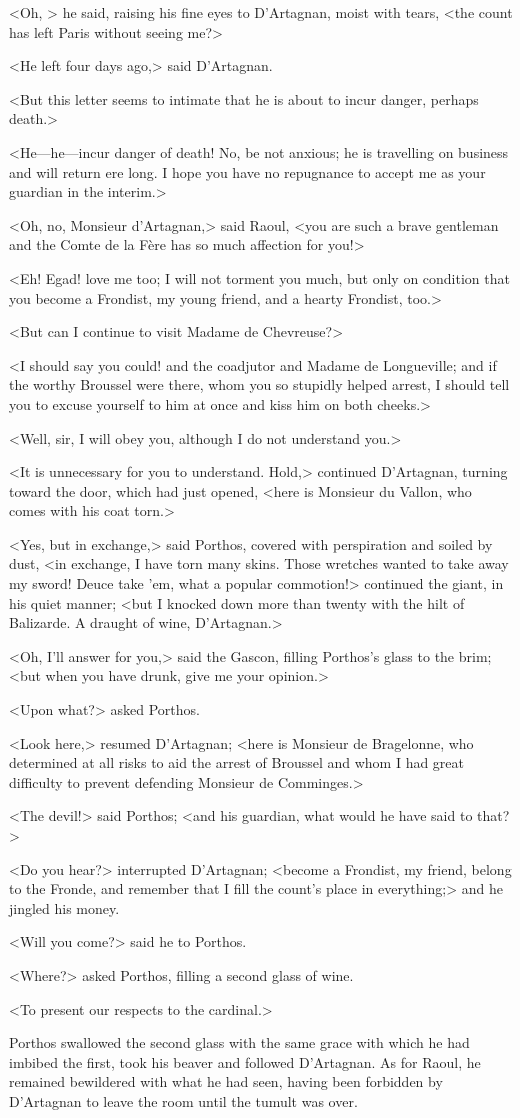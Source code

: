 <Oh, > he said, raising his fine eyes to D'Artagnan, moist with tears, <the count has left Paris without seeing me?>

<He left four days ago,> said D'Artagnan.

<But this letter seems to intimate that he is about to incur danger, perhaps death.>

<He—he—incur danger of death! No, be not anxious; he is travelling on business and will return ere long. I hope you have no repugnance to accept me as your guardian in the interim.>

<Oh, no, Monsieur d'Artagnan,> said Raoul, <you are such a brave gentleman and the Comte de la Fère has so much affection for you!>

<Eh! Egad! love me too; I will not torment you much, but only on condition that you become a Frondist, my young friend, and a hearty Frondist, too.>

<But can I continue to visit Madame de Chevreuse?>

<I should say you could! and the coadjutor and Madame de Longueville; and if the worthy Broussel were there, whom you so stupidly helped arrest, I should tell you to excuse yourself to him at once and kiss him on both cheeks.>

<Well, sir, I will obey you, although I do not understand you.>

<It is unnecessary for you to understand. Hold,> continued D'Artagnan, turning toward the door, which had just opened, <here is Monsieur du Vallon, who comes with his coat torn.>

<Yes, but in exchange,> said Porthos, covered with perspiration and soiled by dust, <in exchange, I have torn many skins. Those wretches wanted to take away my sword! Deuce take 'em, what a popular commotion!> continued the giant, in his quiet manner; <but I knocked down more than twenty with the hilt of Balizarde. A draught of wine, D'Artagnan.>

<Oh, I'll answer for you,> said the Gascon, filling Porthos's glass to the brim; <but when you have drunk, give me your opinion.>

<Upon what?> asked Porthos.

<Look here,> resumed D'Artagnan; <here is Monsieur de Bragelonne, who determined at all risks to aid the arrest of Broussel and whom I had great difficulty to prevent defending Monsieur de Comminges.>

<The devil!> said Porthos; <and his guardian, what would he have said to that?>

<Do you hear?> interrupted D'Artagnan; <become a Frondist, my friend, belong to the Fronde, and remember that I fill the count's place in everything;> and he jingled his money.

<Will you come?> said he to Porthos.

<Where?> asked Porthos, filling a second glass of wine.

<To present our respects to the cardinal.>

Porthos swallowed the second glass with the same grace with which he had imbibed the first, took his beaver and followed D'Artagnan. As for Raoul, he remained bewildered with what he had seen, having been forbidden by D'Artagnan to leave the room until the tumult was over. 